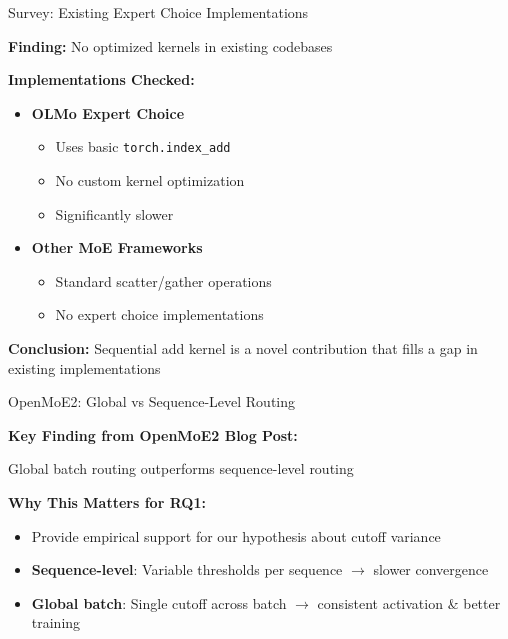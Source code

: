 \documentclass{beamer}
\begin{document}
\begin{frame}{Survey: Existing Expert Choice Implementations}

\textbf{Finding:} No optimized kernels in existing codebases

\vspace{0.4cm}

\textbf{Implementations Checked:}

\begin{itemize}
    \item \textbf{OLMo Expert Choice}
    \begin{itemize}
        \item Uses basic \texttt{torch.index\_add}
        \item No custom kernel optimization
        \item Significantly slower
    \end{itemize}

    \vspace{0.3cm}

    \item \textbf{Other MoE Frameworks}
    \begin{itemize}
        \item Standard scatter/gather operations
        \item No expert choice implementations
    \end{itemize}
\end{itemize}

\vspace{0.4cm}

\textbf{Conclusion:} Sequential add kernel is a novel contribution that fills a gap in existing implementations

\end{frame}

\begin{frame}{OpenMoE2: Global vs Sequence-Level Routing}

\textbf{Key Finding from OpenMoE2 Blog Post:}

\vspace{0.3cm}

Global batch routing outperforms sequence-level routing

\vspace{0.5cm}

\textbf{Why This Matters for RQ1:}

\begin{itemize}
    \item Provide empirical support for our hypothesis about cutoff variance
    \item \textbf{Sequence-level}: Variable thresholds per sequence $\rightarrow$ slower convergence
    \item \textbf{Global batch}: Single cutoff across batch $\rightarrow$ consistent activation \& better training
\end{itemize}

\end{frame}
\end{document}
